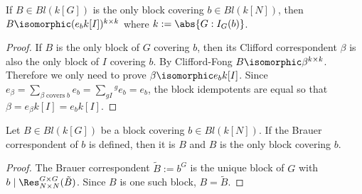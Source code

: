 
\begin{corollary}
If $B\in Bl(k[G])$ is the only block covering $b\in Bl(k[N])$, then $B \isomorphic (e_b k[I])^{k\times k}$ where $k:=\abs{G:I_G(b)}$.
\end{corollary}
\begin{proof}
If $B$ is the only block of $G$ covering $b$, then its Clifford correspondent $\beta$ is also the only block of $I$ covering $b$. By Clifford-Fong $B \isomorphic \beta^{k\times k}$. Therefore we only need to prove $\beta\isomorphic e_b k[I]$. Since $e_\beta=\sum_{\beta\;\text{covers}\;b} e_b = \sum_{gI} {^g e_b} = e_b$, the block idempotents are equal so that $\beta=e_\beta k[I]=e_b k[I]$.
\end{proof}

\begin{corollary}
Let $B\in Bl(k[G])$ be a block covering $b\in Bl(k[N])$. If the Brauer correspondent of $b$ is defined, then it is $B$ and $B$ is the only block covering $b$.
\end{corollary}
\begin{proof}
The Brauer correspondent $\tilde{B}:=b^G$ is the unique block of $G$ with $b \mid \Res_{N\times N}^{G\times G}(\tilde{B})$. Since $B$ is one such block, $B=\tilde{B}$.
\end{proof}

